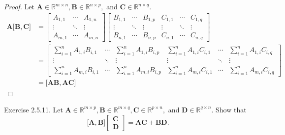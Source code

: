 \documentclass{article}
\theoremstyle{plain}
\begin{document}
\begin{proof}
	Let
	\begin{math}
		\bm{A} \in \mathbb{R}^{m \times n} , \bm{B} \in \mathbb{R}^{n \times p} ,
	\end{math}
	and
	\begin{math}
		\bm{C} \in \mathbb{R}^{n \times q} .
	\end{math}
	\begin{equation*}
		\begin{split}
			\bm{A} \lbrack \bm{B} , \bm{C} \rbrack &=
			\begin{bmatrix}
				A_{1,1} & \cdots & A_{1,n} \\
				\vdots & \ddots & \vdots \\
				A_{m,1} & \cdots & A_{m,n}
			\end{bmatrix}
			\begin{bmatrix}
				B_{1,1} & \cdots & B_{1,p} & C_{1,1} & \cdots & C_{1,q} \\
				\vdots & \ddots & \vdots & \vdots & \ddots & \vdots \\
				B_{n,1} & \cdots & B_{n,p} & C_{n,1} & \cdots & C_{n,q}
			\end{bmatrix} \\
			&=
			\begin{bmatrix}
				\sum_{i=1}^n A_{1,i} B_{i,1} & \cdots & \sum_{i=1}^n A_{1,i} B_{i,p} & \sum_{i=1}^n A_{1,i} C_{i,1} & \cdots & \sum_{i=1}^n A_{1,i} C_{i,q} \\
				\vdots & \ddots & \vdots & \vdots & \ddots & \vdots \\
				\sum_{i=1}^n A_{m,i} B_{i,1} & \cdots & \sum_{i=1}^n A_{m,i} B_{i,p} & \sum_{i=1}^n A_{m,i} C_{i,1} & \cdots & \sum_{i=1}^n A_{m,i} C_{i,q}
			\end{bmatrix} \\
			&= \lbrack \bm{AB} , \bm{AC} \rbrack
		\end{split}
	\end{equation*}
\end{proof}

\begin{itembox}[l]{Exercise 2.5.11.}
	Let
	\begin{math}
		\bm{A} \in \mathbb{R}^{m \times p} , \bm{B} \in \mathbb{R}^{m \times q} , \bm{C} \in \mathbb{R}^{p \times n} ,
	\end{math}
	and
	\begin{math}
		\bm{D} \in \mathbb{R}^{q \times n} .
	\end{math}
	Show that
	\begin{equation}
		\lbrack \bm{A} , \bm{B} \rbrack 
		\begin{bmatrix}
			\bm{C} \\
			\bm{D}
		\end{bmatrix}
		= \bm{AC} + \bm{BD} .
	\end{equation}
\end{itembox}
\end{document}

